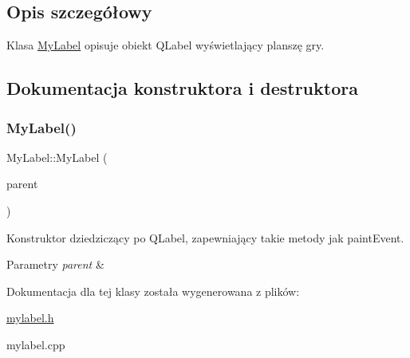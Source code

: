 \subsection{Opis szczegółowy}
Klasa \mbox{\hyperlink{classMyLabel}{My\+Label}} opisuje obiekt Q\+Label wyświetlający planszę gry. 

\subsection{Dokumentacja konstruktora i destruktora}
\mbox{\label{classMyLabel_a6dec17e950b87f0dbc72225cd7ae198f}} 
\subsubsection{\texorpdfstring{MyLabel()}{MyLabel()}}
{\footnotesize\ttfamily My\+Label\+::\+My\+Label (\begin{DoxyParamCaption}\item[{Q\+Widget $\ast$}]{parent }\end{DoxyParamCaption})\hspace{0.3cm}{\ttfamily [explicit]}}



Konstruktor dziedziczący po Q\+Label, zapewniający takie metody jak paint\+Event. 


\begin{DoxyParams}{Parametry}
{\em parent} & \\
\hline
\end{DoxyParams}


Dokumentacja dla tej klasy została wygenerowana z plików\+:\begin{DoxyCompactItemize}
\item 
\mbox{\hyperlink{mylabel_8h}{mylabel.\+h}}\item 
mylabel.\+cpp\end{DoxyCompactItemize}
